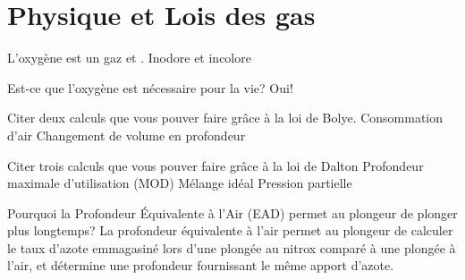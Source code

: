 \documentclass[english,12pt,a4paper]{article}
\begin{document}
	\section{Physique et Lois des gas}
	\begin{outline}
		\1 L'oxygène est un gaz \underline{\hspace{1.5cm}} et \underline{\hspace{1.5cm}}.
			\2 Inodore et incolore

		\1 Est-ce que l'oxygène est nécessaire pour la vie?
			\2 Oui!

		\1 Citer deux calculs  que vous pouver faire grâce à la loi de Bolye.
			\2 Consommation d'air
			\2 Changement de volume en profondeur

		\1 Citer trois calculs que vous pouver faire grâce à la loi de Dalton
			\2 Profondeur maximale d'utilisation (MOD)
			\2 Mélange idéal
			\2 Pression partielle

		\1 Pourquoi la Profondeur Équivalente à l'Air (EAD) permet au plongeur de plonger plus longtemps?
			\2 La profondeur équivalente à l'air permet au plongeur de calculer le taux d'azote emmagasiné lors d'une plongée au nitrox comparé à une plongée à l'air, et détermine une profondeur fournissant le même apport d'azote.
	\end{outline}
	\pagebreak

\end{document}
